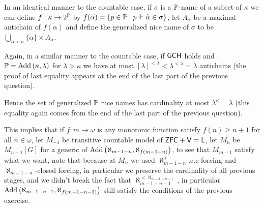 \begin{cExercise}
	In an identical manner to the countable case, if $\sigma$ is a $\P$-name of a subset of $\kappa$ we can define $f:\kappa\to 2^{\P}$ by $f(\alpha)=\{p\in \P\mid p\force \check{\alpha}\in\sigma\}$, let $A_\alpha$ be a maximal antichain of $f(\alpha)$ and define the generalized nice name of $\sigma$ to be $\bigcup_{\alpha<\kappa}\{\check{\alpha}\}\times A_\alpha$.
	
	Again, in a similar manner to the countable case, if $\sf GCH$ holds and $\P=\Add{\kappa}{\lambda}$ for $\lambda>\kappa$ we have at most $[\lambda]^{<\lambda}<\lambda^{<\lambda}=\lambda$ antichains (the proof of last equality appears at the end of the last part of the previous question).
	
	Hence the set of generalized $\P$ nice names has cardinality at most $\lambda^\kappa=\lambda$ (this equality again comes from the end of the last part of the previous question).
	
	This implies that if $f:m\to\omega$ is any monotonic function satisfy $f(n)\ge n+1$ for all $n\in\omega$, let $M_{-1}$ be transitive countable model of $\sf ZFC+V=L$, let $M_n$ be $M_{n-1}[G]$ for a generic of $\Add{\aleph_{m-1-n}}{\aleph_{f(m-1-n)}}$, to see that $M_{m-1}$ satisfy what we want, note that because at $M_n$ we used $\aleph_{m-1-n}^+$.c.c forcing and $\aleph_{m-1-n}$-closed forcing, in particular we preserve the cardinality of all previous stages, and we didn't break the fact that $\aleph_{m-1-n-1}^{<\aleph_{m-1-n-1}}$, in particular $\Add{\aleph_{m-1-n-1}}{\aleph_{f(m-1-n-1)}}$ still satisfy the conditions of the previous exercise.
\end{cExercise}
